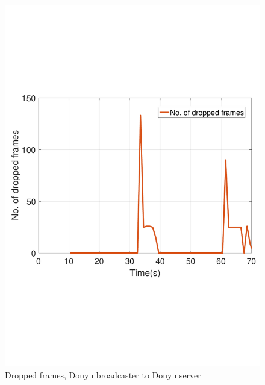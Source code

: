 \begin{figure}[htb]
  \includegraphics[width=\linewidth]{fig/douyu_drop.pdf}
  \caption{Dropped frames, Douyu broadcaster to Douyu server}
  \label{fig:douyu-drop}
\endminipage\hfill
{}%

\end{figure}
